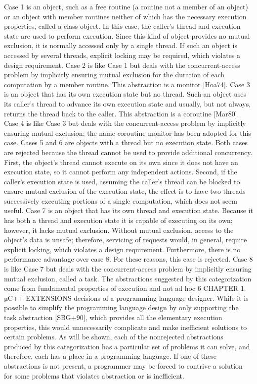 Case 1 is an object, such as a free routine (a routine not a member of an
object) or an object with member routines
neither of which has the necessary execution properties, called a class object.
In this case, the caller’s thread and
execution state are used to perform execution. Since this kind of object
provides no mutual exclusion, it is normally
accessed only by a single thread. If such an object is accessed by several
threads, explicit locking may be required,
which violates a design requirement. Case 2 is like Case 1 but deals with the
concurrent-access problem by implicitly
ensuring mutual exclusion for the duration of each computation by a member
routine. This abstraction is a monitor
[Hoa74]. Case 3 is an object that has its own execution state but no thread.
Such an object uses its caller’s thread
to advance its own execution state and usually, but not always, returns the
thread back to the caller. This abstraction
is a coroutine [Mar80]. Case 4 is like Case 3 but deals with the
concurrent-access problem by implicitly ensuring
mutual exclusion; the name coroutine monitor has been adopted for this case.
Cases 5 and 6 are objects with a thread
but no execution state. Both cases are rejected because the thread cannot be
used to provide additional concurrency.
First, the object’s thread cannot execute on its own since it does not have an
execution state, so it cannot perform any
independent actions. Second, if the caller’s execution state is used, assuming
the caller’s thread can be blocked to
ensure mutual exclusion of the execution state, the effect is to have two
threads successively executing portions of a
single computation, which does not seem useful. Case 7 is an object that has its
own thread and execution state. Because
it has both a thread and execution state it is capable of executing on its own;
however, it lacks mutual exclusion.
Without mutual exclusion, access to the object’s data is unsafe; therefore,
servicing of requests would, in general,
require explicit locking, which violates a design requirement. Furthermore,
there is no performance advantage over
case 8. For these reasons, this case is rejected. Case 8 is like Case 7 but
deals with the concurrent-access problem by
implicitly ensuring mutual exclusion, called a task.
The abstractions suggested by this categorization come from fundamental
properties of execution and not ad hoc
6 CHAPTER 1. µC++ EXTENSIONS
decisions of a programming language designer. While it is possible to simplify
the programming language design by
only supporting the task abstraction [SBG+90], which provides all the elementary
execution properties, this would
unnecessarily complicate and make inefficient solutions to certain problems. As
will be shown, each of the nonrejected
abstractions produced by this categorization has a particular set of problems it
can solve, and therefore, each
has a place in a programming language. If one of these abstractions is not
present, a programmer may be forced to
contrive a solution for some problems that violates abstraction or is
inefficient.

